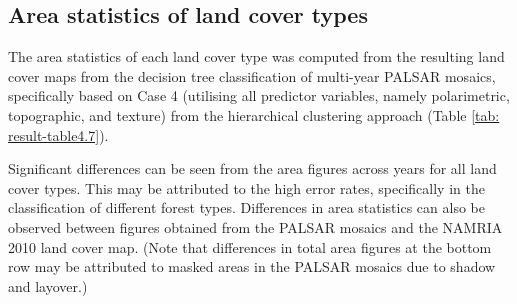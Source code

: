 \subsection{Area statistics of land cover types}

The area statistics of each land cover type was computed from the resulting land cover maps from the decision tree classification of multi-year PALSAR mosaics, specifically based on Case 4 (utilising all predictor variables, namely polarimetric, topographic, and texture) from the hierarchical clustering approach (Table \ref{tab: result-table4.7}).

Significant differences can be seen from the area figures across years for all land cover types. This may be attributed to the high error rates, specifically in the classification of different forest types. Differences in area statistics can also be observed between figures obtained from the PALSAR mosaics and the NAMRIA 2010 land cover map. (Note that differences in total area figures at the bottom row may be attributed to masked areas in the PALSAR mosaics due to shadow and layover.)\\

